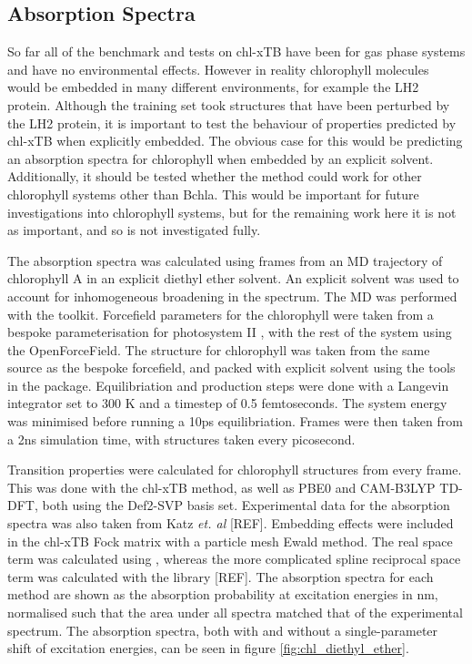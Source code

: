 \afterpartskip
\subsection{Absorption Spectra}
\label{subsec:absorption_spectra}

So far all of the benchmark and tests on chl-xTB have been for gas phase systems
and have no environmental effects. However in reality chlorophyll molecules would
be embedded in many different environments, for example the LH2 protein. Although
the training set took structures that have been perturbed by the LH2 protein, it
is important to test the behaviour of properties predicted by chl-xTB when explicitly
embedded. The obvious case for this would be predicting an absorption spectra for
chlorophyll when embedded by an explicit solvent. Additionally, it should be tested
whether the method could work for other chlorophyll systems other than Bchla. This
would be important for future investigations into chlorophyll systems, but for the
remaining work here it is not as important, and so is not investigated fully.

The absorption spectra was calculated using frames from an MD trajectory of chlorophyll
A in an explicit diethyl ether solvent. An explicit solvent was used to account
for inhomogeneous broadening in the spectrum. The MD was performed with the
 toolkit. Forcefield parameters for the chlorophyll were taken from
a bespoke parameterisation for photosystem II \cite{Zhang2012}, with the rest of
the system using the OpenForceField. The structure for chlorophyll was taken from
the same source as the bespoke forcefield, and packed with explicit solvent using
the tools in the  package. Equilibriation and production steps were 
done with a Langevin integrator set to 300 K  and a timestep of 0.5 femtoseconds.
The system energy was minimised before running a 10ps equilibriation. Frames were
then taken from a 2ns simulation time, with structures taken every picosecond.

Transition properties were calculated for chlorophyll structures from every frame.
This was done with the chl-xTB method, as well as PBE0 and CAM-B3LYP TD-DFT, both
using the Def2-SVP basis set. Experimental data for the absorption spectra was also
taken from Katz \emph{et. al} \cite{Strain1963} [REF]. Embedding effects were included 
in the chl-xTB Fock matrix with a particle mesh Ewald method. The real space term 
was calculated using , whereas the more complicated spline reciprocal
space term was calculated with the  library [REF]. The absorption spectra
for each method are shown as the absorption probability at excitation energies in
nm, normalised such that the area under all spectra matched that of the experimental  
spectrum. The absorption spectra, both with and without a single-parameter shift
of excitation energies, can be seen in figure \ref{fig:chl_diethyl_ether}.

